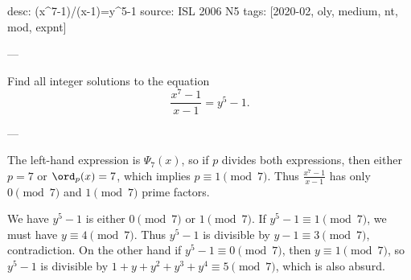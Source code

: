 desc: (x^7-1)/(x-1)=y^5-1
source: ISL 2006 N5
tags: [2020-02, oly, medium, nt, mod, expnt]

---

Find all integer solutions to the equation \[\frac{x^7-1}{x-1}=y^5-1.\]

---

The left-hand expression is $\Psi_7(x)$, so if $p$ divides both expressions, then either $p=7$ or $\ord_p(x)=7$, which implies $p\equiv1\pmod7$. Thus $\frac{x^7-1}{x-1}$ has only $0\pmod7$ and $1\pmod7$ prime factors.

We have $y^5-1$ is either $0\pmod7$ or $1\pmod7$. If $y^5-1\equiv1\pmod7$, we must have $y\equiv4\pmod7$. Thus $y^5-1$ is divisible by $y-1\equiv3\pmod7$, contradiction. On the other hand if $y^5-1\equiv0\pmod7$, then $y\equiv1\pmod7$, so $y^5-1$ is divisible by $1+y+y^2+y^3+y^4\equiv5\pmod7$, which is also absurd.
